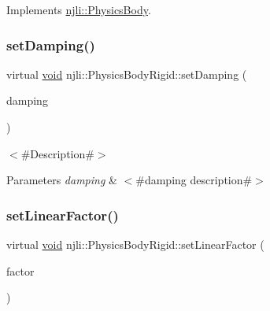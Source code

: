Implements \mbox{\hyperlink{classnjli_1_1_physics_body_a674974f0df3db645620c7156177659ee}{njli\+::\+Physics\+Body}}.

\mbox{\label{classnjli_1_1_physics_body_rigid_a18a20381b14bf38c1dd731a9e25fc278}} 
\subsubsection{\texorpdfstring{set\+Damping()}{setDamping()}}
{\footnotesize\ttfamily virtual \mbox{\hyperlink{_thread_8h_af1e856da2e658414cb2456cb6f7ebc66}{void}} njli\+::\+Physics\+Body\+Rigid\+::set\+Damping (\begin{DoxyParamCaption}\item[{\mbox{\hyperlink{_util_8h_a5f6906312a689f27d70e9d086649d3fd}{f32}}}]{damping }\end{DoxyParamCaption})\hspace{0.3cm}{\ttfamily [virtual]}}

$<$\#\+Description\#$>$


\begin{DoxyParams}{Parameters}
{\em damping} & $<$\#damping description\#$>$ \\
\hline
\end{DoxyParams}
\mbox{\label{classnjli_1_1_physics_body_rigid_a3d02fd518a3031f48f3512b8026a8a75}} 
\subsubsection{\texorpdfstring{set\+Linear\+Factor()}{setLinearFactor()}}
{\footnotesize\ttfamily virtual \mbox{\hyperlink{_thread_8h_af1e856da2e658414cb2456cb6f7ebc66}{void}} njli\+::\+Physics\+Body\+Rigid\+::set\+Linear\+Factor (\begin{DoxyParamCaption}\item[{const bt\+Vector3 \&}]{factor }\end{DoxyParamCaption})\hspace{0.3cm}{\ttfamily [virtual]}}

